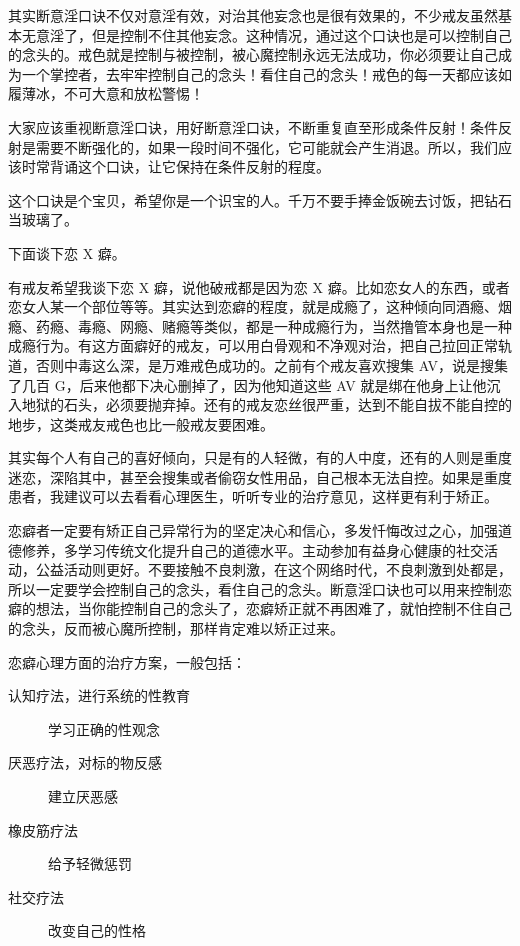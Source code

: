 \documentclass[fontset=founder]{ctexart}
\begin{document}
其实断意淫口诀不仅对意淫有效，对治其他妄念也是很有效果的，不少戒友虽然基本无意淫了，但是控制不住其他妄念。这种情况，通过这个口诀也是可以控制自己的念头的。戒色就是控制与被控制，被心魔控制永远无法成功，你必须要让自己成为一个掌控者，去牢牢控制自己的念头！看住自己的念头！戒色的每一天都应该如履薄冰，不可大意和放松警惕！

大家应该重视断意淫口诀，用好断意淫口诀，不断重复直至形成条件反射！条件反射是需要不断强化的，如果一段时间不强化，它可能就会产生消退。所以，我们应该时常背诵这个口诀，让它保持在条件反射的程度。

这个口诀是个宝贝，希望你是一个识宝的人。千万不要手捧金饭碗去讨饭，把钻石当玻璃了。

下面谈下恋 X 癖。

有戒友希望我谈下恋 X 癖，说他破戒都是因为恋 X 癖。比如恋女人的东西，或者恋女人某一个部位等等。其实达到恋癖的程度，就是成瘾了，这种倾向同酒瘾、烟瘾、药瘾、毒瘾、网瘾、赌瘾等类似，都是一种成瘾行为，当然撸管本身也是一种成瘾行为。有这方面癖好的戒友，可以用白骨观和不净观对治，把自己拉回正常轨道，否则中毒这么深，是万难戒色成功的。之前有个戒友喜欢搜集 AV，说是搜集了几百 G，后来他都下决心删掉了，因为他知道这些 AV 就是绑在他身上让他沉入地狱的石头，必须要抛弃掉。还有的戒友恋丝很严重，达到不能自拔不能自控的地步，这类戒友戒色也比一般戒友要困难。

其实每个人有自己的喜好倾向，只是有的人轻微，有的人中度，还有的人则是重度迷恋，深陷其中，甚至会搜集或者偷窃女性用品，自己根本无法自控。如果是重度患者，我建议可以去看看心理医生，听听专业的治疗意见，这样更有利于矫正。

恋癖者一定要有矫正自己异常行为的坚定决心和信心，多发忏悔改过之心，加强道德修养，多学习传统文化提升自己的道德水平。主动参加有益身心健康的社交活动，公益活动则更好。不要接触不良刺激，在这个网络时代，不良刺激到处都是，所以一定要学会控制自己的念头，看住自己的念头。断意淫口诀也可以用来控制恋癖的想法，当你能控制自己的念头了，恋癖矫正就不再困难了，就怕控制不住自己的念头，反而被心魔所控制，那样肯定难以矫正过来。

恋癖心理方面的治疗方案，一般包括：

\begin{description}
    \item [认知疗法，进行系统的性教育] 学习正确的性观念
    \item [厌恶疗法，对标的物反感] 建立厌恶感
    \item [橡皮筋疗法] 给予轻微惩罚
    \item [社交疗法] 改变自己的性格
\end{description}
\end{document}
